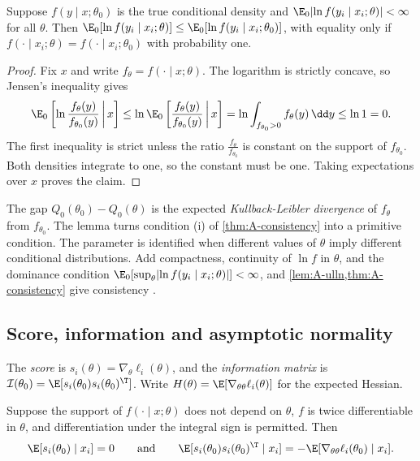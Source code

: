 \begin{lemma}\label{lem:A-info-inequality}
Suppose $f(y \mid x;\theta_0)$ is the true conditional density and $\E_0\lvert\ln f(y_i \mid x_i;\theta)\rvert < \infty$
for all $\theta$. Then $\E_0[\ln f(y_i \mid x_i;\theta)] \le \E_0[\ln f(y_i \mid x_i;\theta_0)]$, with equality only if
$f(\cdot \mid x_i;\theta) = f(\cdot \mid x_i;\theta_0)$ with probability one.
\end{lemma}

\begin{proof}
Fix $x$ and write $f_\theta = f(\cdot \mid x;\theta)$. The logarithm is strictly concave, so Jensen's inequality gives
\begin{equation*}
  \E_0\left[\ln\frac{f_\theta(y)}{f_{\theta_0}(y)}\,\middle|\, x\right] \le \ln\E_0\left[\frac{f_\theta(y)}{f_{\theta_0}(y)}\,\middle|\,
  x\right] = \ln\int_{f_{\theta_0} > 0}f_\theta(y)\,\dd y \le \ln 1 = 0.
\end{equation*}
The first inequality is strict unless the ratio $\frac{f_\theta}{f_{\theta_0}}$ is constant on the support of $f_{\theta_0}$.
Both densities integrate to one, so the constant must be one. Taking expectations over $x$ proves the claim.
\end{proof}

The gap $Q_0(\theta_0) - Q_0(\theta)$ is the expected \emph{Kullback-Leibler divergence} of $f_\theta$ from $f_{\theta_0}$. The
lemma turns condition (i) of \cref{thm:A-consistency} into a primitive condition. The parameter is identified when
different values of $\theta$ imply different conditional distributions. Add compactness, continuity of $\ln f$ in
$\theta$, and the dominance condition $\E_0[\sup_\theta\lvert\ln f(y_i \mid x_i;\theta)\rvert] < \infty$, and
\cref{lem:A-ulln,thm:A-consistency} give consistency \citep[Theorem 2.5]{NeweyMcFadden1994}.

\subsection{Score, information and asymptotic normality}\label{sec:A-mle-score}

The \emph{score} is $s_i(\theta) = \nabla_\theta\ell_i(\theta)$, and the \emph{information matrix} is
$\mathcal{I}(\theta_0) = \E[s_i(\theta_0)s_i(\theta_0)^\T]$. Write $H(\theta) = \E[\nabla_{\theta\theta}\ell_i(\theta)]$ for the
expected Hessian.

\begin{lemma}\label{lem:A-info-equality}
Suppose the support of $f(\cdot \mid x;\theta)$ does not depend on $\theta$, $f$ is twice differentiable in $\theta$, and
differentiation under the integral sign is permitted. Then
\begin{equation*}
  \E[s_i(\theta_0) \mid x_i] = 0 \qquad\text{and}\qquad \E[s_i(\theta_0)s_i(\theta_0)^\T \mid x_i] =
  -\E[\nabla_{\theta\theta}\ell_i(\theta_0) \mid x_i].
\end{equation*}
\end{lemma}

